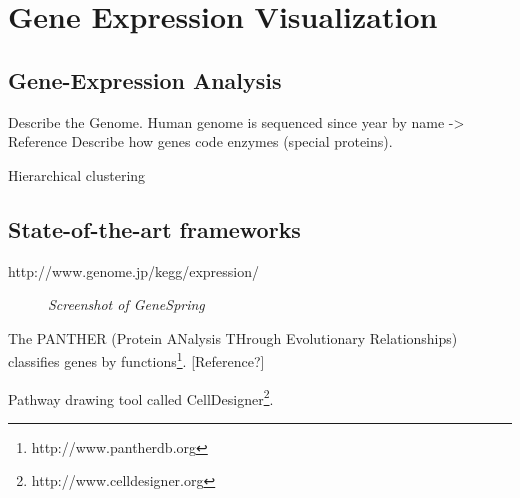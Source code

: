 \section{Gene Expression Visualization}

\subsection{Gene-Expression Analysis}

Describe the Genome.
Human genome is sequenced since year by name -> Reference 
Describe how genes code enzymes (special proteins).

Hierarchical clustering\citep{Seo2002}

\subsection{State-of-the-art frameworks}

http://www.genome.jp/kegg/expression/


\begin{figure}[ht]
\centering
{} 
\caption[Screenshot of GeneSpring]{\textit{Screenshot of GeneSpring}} 
\label{gfx:screenshot_gene_spring}
\end{figure}


The PANTHER (Protein ANalysis THrough Evolutionary Relationships) classifies genes by functions\footnote{http://www.pantherdb.org}.
[Reference?]

Pathway drawing tool called CellDesigner\footnote{http://www.celldesigner.org}.

